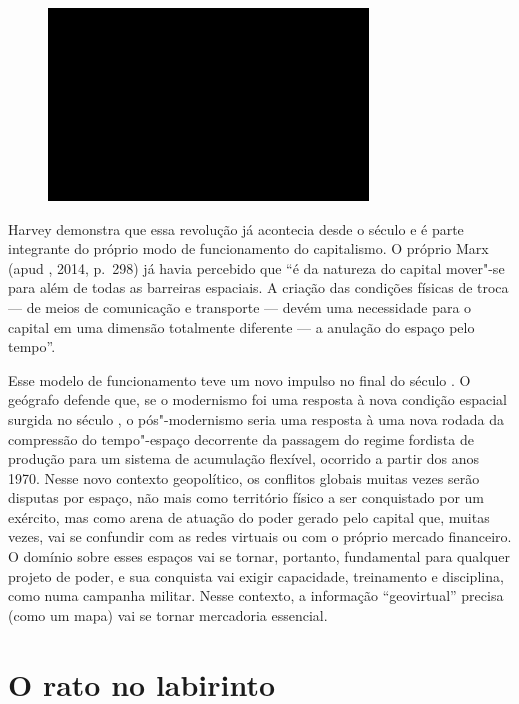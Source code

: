 \begin{figure}[!ht]
\centering
 \includegraphics[width=85mm]{./imgs/im1.jpg}
\caption{\tiny{}}
\end{figure}

Harvey demonstra que essa revolução já acontecia desde o século  e é
parte integrante do próprio modo de funcionamento do capitalismo. O
próprio Marx (apud , 2014, p.~298) já havia percebido que ``é da natureza do capital mover"-se
para além de todas as barreiras espaciais. A criação das condições
físicas de troca --- de meios de comunicação e transporte --- devém uma
necessidade para o capital em uma dimensão totalmente diferente --- a
anulação do espaço pelo tempo''.

Esse modelo de funcionamento teve um novo impulso no final do século .
O geógrafo defende que, se o modernismo foi uma resposta à nova condição
espacial surgida no século , o pós"-modernismo seria uma resposta à
uma nova rodada da compressão do tempo"-espaço decorrente da passagem do
regime fordista de produção para um sistema de acumulação flexível,
ocorrido a partir dos anos 1970. Nesse novo contexto geopolítico, os
conflitos globais muitas vezes serão disputas por espaço, não mais como
território físico a ser conquistado por um exército, mas como arena de
atuação do poder gerado pelo capital que, muitas vezes, vai se confundir
com as redes virtuais ou com o próprio mercado financeiro. O domínio
sobre esses espaços vai se tornar, portanto, fundamental para qualquer
projeto de poder, e sua conquista vai exigir capacidade, treinamento e
disciplina, como numa campanha militar. Nesse contexto, a informação
``geovirtual'' precisa (como um mapa) vai se tornar mercadoria
essencial.

\chapter{O rato no labirinto}

